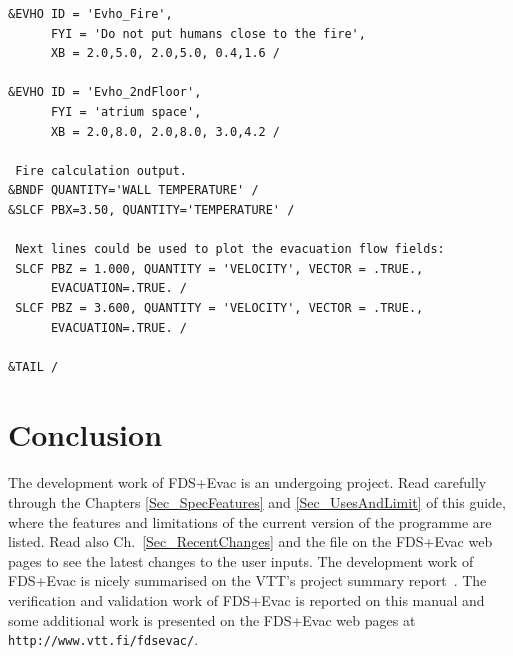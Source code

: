 \documentclass[12pt,a4paper,final,twoside]{stylevk}
\begin{document}
{\begin{verbatim}
&EVHO ID = 'Evho_Fire',
      FYI = 'Do not put humans close to the fire',
      XB = 2.0,5.0, 2.0,5.0, 0.4,1.6 /

&EVHO ID = 'Evho_2ndFloor',
      FYI = 'atrium space',
      XB = 2.0,8.0, 2.0,8.0, 3.0,4.2 /

 Fire calculation output.
&BNDF QUANTITY='WALL TEMPERATURE' / 
&SLCF PBX=3.50, QUANTITY='TEMPERATURE' /

 Next lines could be used to plot the evacuation flow fields:
 SLCF PBZ = 1.000, QUANTITY = 'VELOCITY', VECTOR = .TRUE., 
      EVACUATION=.TRUE. / 
 SLCF PBZ = 3.600, QUANTITY = 'VELOCITY', VECTOR = .TRUE., 
      EVACUATION=.TRUE. / 

&TAIL /
\end{verbatim}
}

\clearpage

\newpage


\chapter{Conclusion}\label{Sec_Conclusions}

\noindent The development work of FDS+Evac is an undergoing project.
Read carefully through the Chapters \ref{Sec_SpecFeatures} and
\ref{Sec_UsesAndLimit} of this guide, where the features and
limitations of the current version of the programme are listed.  Read
also Ch.~\ref{Sec_RecentChanges} and the  file on
the FDS+Evac web pages to see the latest changes to the user inputs.
The development work of FDS+Evac is nicely summarised on the VTT's
project summary report~\cite{Hostikka07a}.  The verification and
validation work of FDS+Evac is reported on this manual and some
additional work is presented on the FDS+Evac web pages at
\texttt{http://www.vtt.fi/fdsevac/}.
\end{document}
